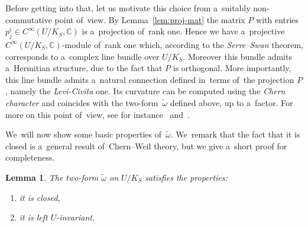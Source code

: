 \documentclass[10pt,a4paper]{amsart}
\numberwithin{equation}{section}
\newtheorem{Lemma}[Theorem]{Lemma}
\newcommand{\bbC}{\mathbb{C}}
\newcommand{\kafot}{\tilde{\omega}}
\begin{document}
Before getting into that, let us motivate this choice from a~suitably non-commutative point of~view.
By Lemma~\ref{lem:proj-mat} the matrix $P$ with entries $p^i_j \in C^\infty(U / K_S, \bbC)$ is a~projection of~rank one.
Hence we have a~projective $C^\infty(U / K_S, \bbC)$-module of~rank one which, according to the \emph{Serre--Swan} theorem, corresponds to a~complex line bundle over $U / K_S$.
Moreover this bundle admits a~Hermitian structure, due to the fact that $P$ is orthogonal.
More importantly, this line bundle admits a~natural connection defined in~terms of~the projection $P$, namely the \emph{Levi-Civita} one.
Its curvature can be computed using the \emph{Chern character} and coincides with the two-form~$\tilde{\omega}$ defined above, up to a~factor.
For more on this point of~view, see for instance~\cite[Chapter~1]{karoubi} and~\cite[Chapter~8]{loday}.

We~will now show some basic properties of~$\kafot$.
We~remark that the fact that it is closed is a~general result of~Chern--Weil theory, but we give a~short proof for completeness.

\begin{Lemma}
The two-form $\kafot$ on $U / K_S$ satisfies the properties:
\begin{enumerate}\itemsep=0pt
\item[$1)$] it is closed,
\item[$2)$] it is left $U$-invariant.
\end{enumerate}
\end{Lemma}
\end{document}
